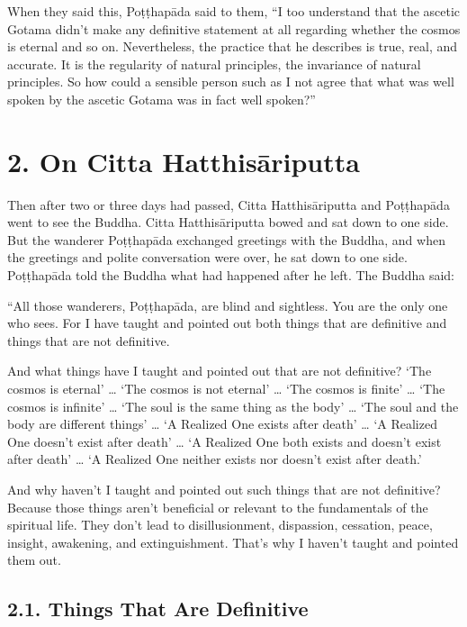 \documentclass[12pt,openany]{book}%
\begin{document}
When they said this, \textsanskrit{Poṭṭhapāda} said to them, “I too understand that the ascetic Gotama didn’t make any definitive statement at all regarding whether the cosmos is eternal and so on. Nevertheless, the practice that he describes is true, real, and accurate. It is the regularity of natural principles, the invariance of natural principles. So how could a sensible person such as I not agree that what was well spoken by the ascetic Gotama was in fact well spoken?” 

\section*{2. On Citta \textsanskrit{Hatthisāriputta} }

Then after two or three days had passed, Citta \textsanskrit{Hatthisāriputta} and \textsanskrit{Poṭṭhapāda} went to see the Buddha. Citta \textsanskrit{Hatthisāriputta} bowed and sat down to one side. But the wanderer \textsanskrit{Poṭṭhapāda} exchanged greetings with the Buddha, and when the greetings and polite conversation were over, he sat down to one side. \textsanskrit{Poṭṭhapāda} told the Buddha what had happened after he left. The Buddha said: 

“All those wanderers, \textsanskrit{Poṭṭhapāda}, are blind and sightless. You are the only one who sees. For I have taught and pointed out both things that are definitive and things that are not definitive. 

And what things have I taught and pointed out that are not definitive? ‘The cosmos is eternal’ … ‘The cosmos is not eternal’ … ‘The cosmos is finite’ … ‘The cosmos is infinite’ … ‘The soul is the same thing as the body’ … ‘The soul and the body are different things’ … ‘A Realized One exists after death’ … ‘A Realized One doesn’t exist after death’ … ‘A Realized One both exists and doesn’t exist after death’ … ‘A Realized One neither exists nor doesn’t exist after death.’ 

And why haven’t I taught and pointed out such things that are not definitive? Because those things aren’t beneficial or relevant to the fundamentals of the spiritual life. They don’t lead to disillusionment, dispassion, cessation, peace, insight, awakening, and extinguishment. That’s why I haven’t taught and pointed them out. 

\subsection*{2.1. Things That Are Definitive }
\end{document}

